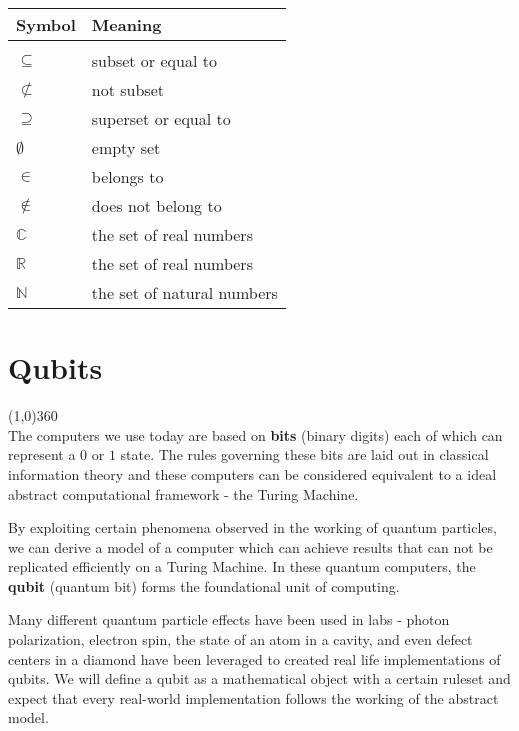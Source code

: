 \documentclass[12pt,twoside,fleqn]{report}
\theoremstyle{thmstyle}
\begin{document}
\begin{tabular}{p{2cm}p{5cm}}
\textbf{Symbol} & \textbf{Meaning}\\
\hline
& \\
$\subseteq$ & subset or equal to \\%
$\not\subset$ & not subset\\%
$\supseteq$ & superset or equal to \\
$\emptyset$ & empty set\\%
$\in$ & belongs to\\%
$\not \in $ & does not belong to \\
$\mathbb{C}$ & the set of real numbers\\%
$\mathbb{R}$ & the set of real numbers\\%
$\mathbb{N}$ & the set of natural numbers\\%
\end{tabular}

\tableofcontents
\newpage
{}

\chapter{Qubits}

\line(1,0){360} \\

The computers we use today are based on \textbf{bits} (binary digits) each of which can represent a $0$ or $1$ state. The rules governing these bits are laid out in classical information theory and these computers can be considered equivalent to a ideal abstract computational framework - the Turing Machine.

By exploiting certain phenomena observed in the working of quantum particles, we can derive a model of a computer which can achieve results that can not be replicated efficiently on a Turing Machine. In these quantum computers, the \textbf{qubit} (quantum bit) forms the foundational unit of computing.

Many different quantum particle effects have been used in labs - photon polarization, electron spin, the state of an atom in a cavity, and even defect centers in a diamond have been leveraged to created real life implementations of qubits. We will define a qubit as a mathematical object with a certain ruleset and expect that every real-world implementation follows the working of the abstract model.
\end{document}
